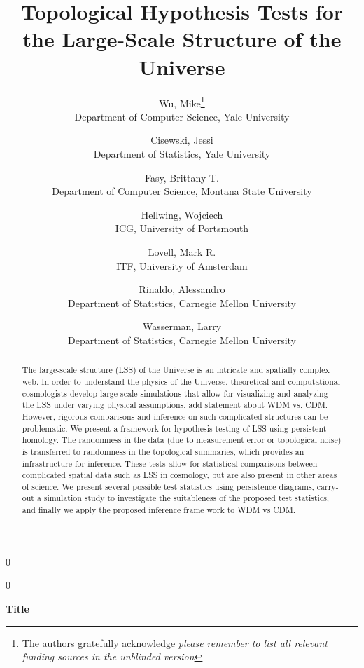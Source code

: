 \documentclass[12pt]{article}
\newcommand{\blind}{0}
\begin{document}
%

\def\spacingset#1{\renewcommand{\baselinestretch}%
{#1}\small\normalsize} \spacingset{1}



\blind
{
  \title{\bf Topological Hypothesis Tests for the Large-Scale Structure of the Universe}
  \author{Wu, Mike\thanks{
    The authors gratefully acknowledge \textit{please remember to list all relevant funding sources in the unblinded version}}\hspace{.2cm}\\
    Department of Computer Science, Yale University
    \and
    Cisewski, Jessi\\
    Department of Statistics, Yale University
    \and
    Fasy, Brittany T.\\
    Department of Computer Science, Montana State University
    \and
    Hellwing, Wojciech\\
    ICG, University of Portsmouth
    \and
    Lovell, Mark R.\\
    ITF, University of Amsterdam
    \and
    Rinaldo, Alessandro\\
    Department of Statistics, Carnegie Mellon University
    \and
    Wasserman, Larry\\
    Department of Statistics, Carnegie Mellon University
  }
  \maketitle
} \fi

\blind
{
  \bigskip
  \bigskip
  \bigskip
  \begin{center}
    {\LARGE\bf Title}
\end{center}
  \medskip
} \fi


\bigskip
\begin{abstract}
The large-scale structure (LSS) of the Universe is an intricate and spatially complex web.  In order to understand the physics of the Universe, theoretical and computational cosmologists develop large-scale simulations that allow for visualizing and analyzing the LSS under varying physical assumptions.  {\color{red}  add statement about WDM vs. CDM.}  However, rigorous comparisons and inference on such complicated structures can be problematic.  We present a framework for hypothesis testing of LSS using persistent homology.  The randomness in the data (due to measurement error or topological noise) is transferred to randomness in the topological
summaries, which provides an infrastructure for inference. These tests allow for statistical comparisons between complicated spatial data such as LSS in cosmology, but are also present in other areas of science.  We present several possible test statistics using persistence diagrams, carry-out a simulation study to investigate the suitableness of the proposed test statistics, and finally we apply the proposed inference frame work to {\color{red} WDM vs CDM}.
\end{abstract}
\end{document}
